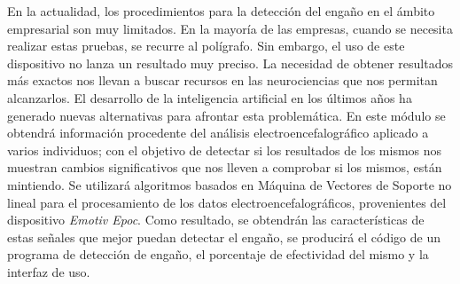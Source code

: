 En la actualidad, los procedimientos para la detección del engaño en el ámbito empresarial son muy limitados.  En la mayoría de las empresas, cuando se necesita realizar estas pruebas, se recurre al polígrafo. Sin embargo, el uso de este dispositivo no lanza un resultado muy preciso. La necesidad de obtener resultados más exactos nos llevan a buscar recursos en las neurociencias que nos permitan alcanzarlos.  El desarrollo de la inteligencia artificial en los últimos años ha generado nuevas alternativas para afrontar esta problemática. En este módulo se obtendrá información procedente del análisis electroencefalográfico aplicado a varios individuos; con el objetivo de detectar si los resultados de los mismos nos muestran cambios significativos que nos lleven a comprobar si los mismos, están mintiendo. Se utilizará algoritmos basados en Máquina de Vectores de Soporte no lineal para el procesamiento de los datos electroencefalográficos, provenientes del dispositivo \textit{Emotiv Epoc}. Como resultado, se obtendrán las características de estas señales que mejor puedan detectar el engaño, se producirá el código de un programa de detección de engaño, el porcentaje de efectividad del mismo y la interfaz de uso.